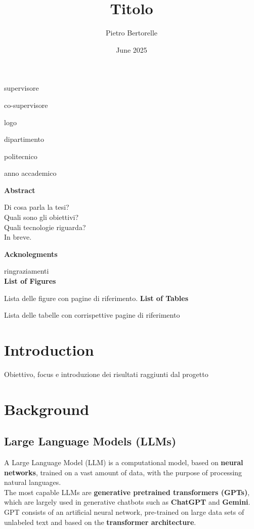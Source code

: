 \documentclass[12pt]{article}
\title{Titolo}
\author{Pietro Bertorelle}
\date{June 2025}
\begin{document}
\maketitle
supervisore

co-supervisore

logo

dipartimento

politecnico

anno accademico

\clearpage
\textbf{Abstract}

Di cosa parla la tesi?\\
Quali sono gli obiettivi?\\ 
Quali tecnologie riguarda?\\
In breve.

\textbf{Acknolegments}

ringraziamenti\\
\clearpage
\tableofcontents
\clearpage
\textbf{List of Figures}

Lista delle figure con pagine di riferimento.
\clearpage
\textbf{List of Tables}

Lista delle tabelle con corrispettive pagine di riferimento
\clearpage
\section{Introduction}

Obiettivo, focus e introduzione dei risultati raggiunti dal progetto
\clearpage
\section{Background}
    \subsection{Large Language Models (LLMs)}
A Large Language Model (LLM) is a computational model, based on \textbf{neural networks}, trained on a vast amount of data, with the purpose of processing natural languages.\\
The most capable LLMs are \textbf{generative pretrained transformers (GPTs)}, which are largely used in generative chatbots such as \textbf{ChatGPT} and \textbf{Gemini}. GPT consists of an artificial neural network, pre-trained on large data sets of unlabeled text and based on the \textbf{transformer architecture}.
\end{document}
